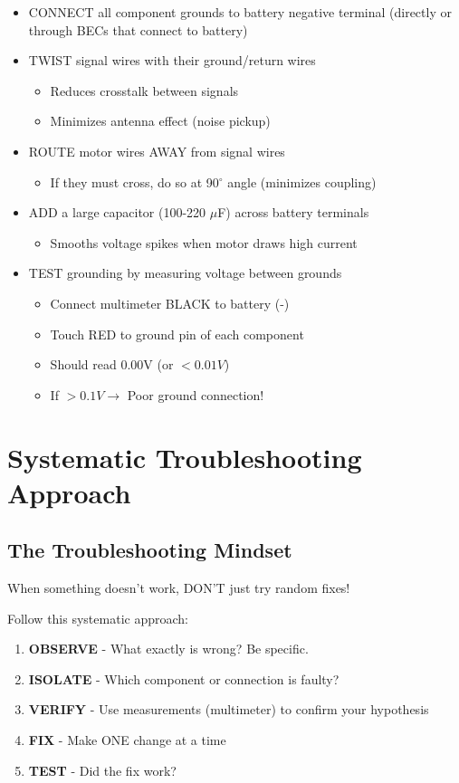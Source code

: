 \documentclass[11pt,letterpaper]{article}
\begin{document}
\begin{itemize}
\item CONNECT all component grounds to battery negative terminal (directly or through BECs that connect to battery)
\item TWIST signal wires with their ground/return wires
\begin{itemize}
\item Reduces crosstalk between signals
\item Minimizes antenna effect (noise pickup)
\end{itemize}
\item ROUTE motor wires AWAY from signal wires
\begin{itemize}
\item If they must cross, do so at 90$^\circ$ angle (minimizes coupling)
\end{itemize}
\item ADD a large capacitor (100-220 $\mu$F) across battery terminals
\begin{itemize}
\item Smooths voltage spikes when motor draws high current
\end{itemize}
\item TEST grounding by measuring voltage between grounds
\begin{itemize}
\item Connect multimeter BLACK to battery (-)
\item Touch RED to ground pin of each component
\item Should read 0.00V (or $< 0.01V$)
\item If $> 0.1V \rightarrow$ Poor ground connection!
\end{itemize}
\end{itemize}

\newpage
\section{Systematic Troubleshooting Approach}

\subsection{The Troubleshooting Mindset}

When something doesn't work, DON'T just try random fixes!

Follow this systematic approach:
\begin{enumerate}
\item \textbf{OBSERVE} - What exactly is wrong? Be specific.
\item \textbf{ISOLATE} - Which component or connection is faulty?
\item \textbf{VERIFY} - Use measurements (multimeter) to confirm your hypothesis
\item \textbf{FIX} - Make ONE change at a time
\item \textbf{TEST} - Did the fix work?
\end{enumerate}
\end{document}
